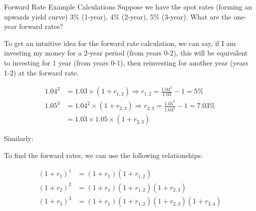 \begin{examplebox}{Forward Rate Example Calculations}
    Suppose we have the spot rates (forming an upwards yield curve) 3\% (1-year), 4\% (2-year), 5\% (3-year).
    What are the one-year forward rates?

    \begin{figure}[H]
        \centering
        
    \end{figure}

    To get an intuitive idea for the forward rate calculation, we can say, if I am investing my money for a 2-year period (from years 0-2), this will be equivalent to investing for 1 year (from years 0-1), then reinvesting for another year (years 1-2) at the forward rate.


    \begin{align*}
        1.04^2 &= 1.03 \times (1 + r_{1,2}) \Rightarrow r_{1,2} = \frac{1.04^2}{1.03} - 1 = 5\%\\
        1.05^3 &= 1.04^2 \times (1 + r_{2,3}) \Rightarrow r_{2,3} = \frac{1.05^3}{1.04^2} - 1 = 7.03\% \\
               &= 1.03 \times 1.05 \times (1 + r_{2,3}) 
    \end{align*}


    Similarly:

    To find the forward rates, we can use the following relationships:

    \begin{align*}
        (1 + r_1)^1 &= (1 + r_1)(1 + r_{1,2}) \\
        (1 + r_2)^2 &= (1 + r_1)(1 + r_{1,2})(1 + r_{2,3}) \\
        (1 + r_3)^3 &= (1 + r_1)(1 + r_{1,2})(1 + r_{2,3})(1 + r_{3,4})
    \end{align*}


\end{examplebox}
